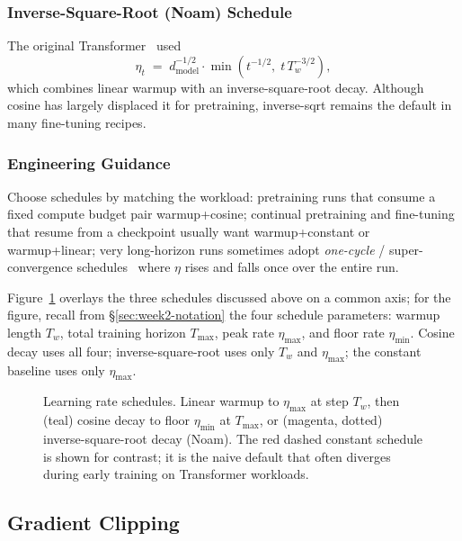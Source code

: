\subsubsection{Inverse-Square-Root (Noam) Schedule}

The original Transformer~\citep{vaswani2017attention} used
\begin{equation}
\eta_t \;=\; d_{\mathrm{model}}^{-1/2} \cdot
            \min\!\left(t^{-1/2},\; t\, T_w^{-3/2}\right),
\end{equation}
which combines linear warmup with an inverse-square-root decay.
Although cosine has largely displaced it for pretraining, inverse-sqrt
remains the default in many fine-tuning recipes.

\subsubsection{Engineering Guidance}

Choose schedules by matching the workload:
pretraining runs that consume a fixed compute budget pair warmup+cosine;
continual pretraining and fine-tuning that resume from a checkpoint
usually want warmup+constant or warmup+linear; very long-horizon runs
sometimes adopt \emph{one-cycle} / super-convergence
schedules~\citep{smith2018superconvergence} where $\eta$ rises and falls
once over the entire run.

Figure~\ref{fig:lr_schedule} overlays the three schedules discussed
above on a common axis; for the figure, recall from
\S\ref{sec:week2-notation} the four schedule parameters:
warmup length $T_w$, total training horizon $T_{\max}$, peak rate
$\eta_{\max}$, and floor rate $\eta_{\min}$. Cosine decay uses all
four; inverse-square-root uses only $T_w$ and $\eta_{\max}$; the
constant baseline uses only $\eta_{\max}$.

\begin{figure}[H]
  \centering
  
  \caption{Learning rate schedules. Linear warmup to $\eta_{\max}$ at
           step $T_w$, then (teal) cosine decay to floor $\eta_{\min}$
           at $T_{\max}$, or (magenta, dotted) inverse-square-root
           decay (Noam). The red dashed constant schedule is shown
           for contrast; it is the naive default that often diverges
           during early training on Transformer workloads.}
  \label{fig:lr_schedule}
\end{figure}

\subsection{Gradient Clipping}

